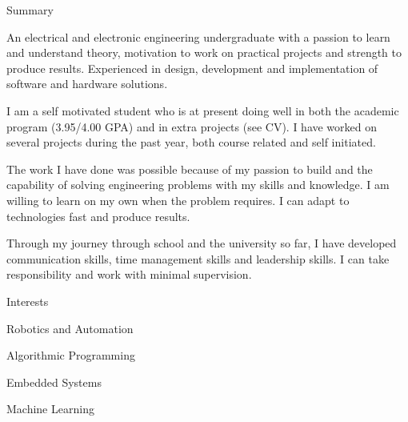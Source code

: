 \documentclass{resume} %
\begin{document}

\begin{rSection}{Summary}

An electrical and electronic engineering undergraduate with a passion to learn and understand theory, motivation to work on practical projects and strength to produce results. Experienced in design, development and implementation of software and hardware solutions. 

I am a self motivated student who is at present doing well in both the academic program (3.95/4.00 GPA) and in extra projects (see CV). I have worked on several projects during the past year, both course related and self initiated.

The work I have done was possible because of my passion to build and the capability of solving engineering problems with my skills and knowledge. I am willing to learn on my own when the problem requires. I can adapt to technologies fast and produce results.

Through my journey through school and the university so far, I have developed communication skills, time management skills and leadership skills. I can take responsibility and work with minimal supervision.

\end{rSection}




\begin{rSection}{Interests}
\begin{rSubsection}{}{}{}{}
\item Robotics and Automation
\item Algorithmic Programming 
\item Embedded Systems
\item Machine Learning
\end{rSubsection}


\end{rSection}
\end{document}
